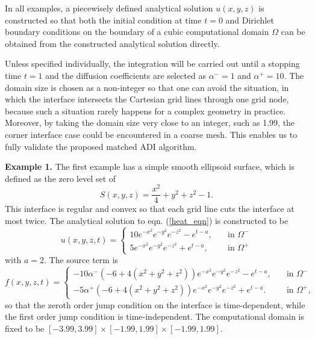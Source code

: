 \documentclass[dissertation]{uathesis}
\begin{document}
\begin{body}
\begin{flushleft}
\hspace{1cm} In all examples, a piecewisely defined analytical solution $u(x,y,z)$ is constructed so that both the initial condition at time $t=0$ and Dirichlet boundary conditions on the boundary of a cubic computational domain $\Omega$ can be obtained from the constructed analytical solution directly.
 
\hspace{1cm} Unless specified individually, the integration will be carried out until a stopping time $t=1$ and the diffusion coefficients are selected as $\alpha^{-}=1$ and $\alpha^{+}=10$. 
The domain size is chosen as a non-integer so that one can avoid the situation, in which
the interface intersects the Cartesian grid lines through one grid node,
because  such a situation rarely happens for a complex geometry in practice. 
Moreover, by taking the domain size very close to an integer, such as 1.99, 
the corner interface case could be encountered in a coarse mesh. 
This enables us to fully validate the proposed matched ADI algorithm.

{\flushleft \bf Example 1.} The first example has a simple smooth ellipsoid surface, which is defined as the zero level set of
% 
\begin{equation} \label{ellipsoid}
S(x,y,z) = \frac{x^{2}}{4} + y^{2} + z^{2} -1.
\end{equation}
%
This interface is regular and convex so that each grid line cuts the interface at most twice. The analytical solution to eqn. (\ref{heat_eqn}) is constructed to be
%
\begin{equation} \label{analytical_eqn_1}
u(x,y,z,t)= 
\begin{cases}
10e^{-x^{2}}e^{-y^{2}}e^{-z^{2}}-e^{t-a}, \quad   &\mbox{in } \Omega^{-} \\
5e^{-x^{2}}e^{-y^{2}}e^{-z^{2}}+e^{t-a},  \quad   &\mbox{in } \Omega^{+}
\end{cases}
\end{equation}
%
with $a=2$. The source term is
%
\begin{equation} \label{source_eqn_1}
f(x,y,z,t)= 
\begin{cases}
-10 \alpha^{-} (-6+4(x^{2}+y^{2}+z^{2})) e^{-x^{2}}e^{-y^{2}}e^{-z^{2}} - e^{t-a}, \quad   &\mbox{in } \Omega^{-} \\
-5 \alpha^{+} (-6+4(x^{2}+y^{2}+z^{2})) e^{-x^{2}}e^{-y^{2}}e^{-z^{2}} + e^{t-a}.  \quad   &\mbox{in } \Omega^{+},
\end{cases}
\end{equation}
%
so that the zeroth order jump condition on the interface is time-dependent, while the first order jump condition is time-independent. The computational domain is fixed to be  $[-3.99,3.99]\times[-1.99,1.99]\times[-1.99,1.99]$. 


\end{flushleft}
\end{body}
\end{document}
